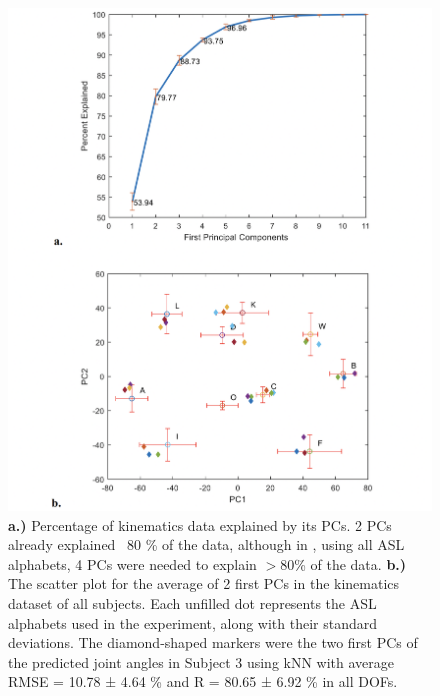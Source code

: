\documentclass[conference]{IEEEtran}
\begin{document}
\begin{figure}
    \centering
    \includegraphics[width=\columnwidth]{figure5.png}
    \caption{\textbf{a.)} Percentage of kinematics data explained by its PCs. 2 PCs already explained ~80 \% of 
the data, although in \cite{b28}, using all ASL alphabets, 4 PCs were needed to explain $>$80\% of the data. 
\textbf{b.)} The scatter plot for the average of 2 first PCs in the kinematics dataset of all subjects. Each unfilled 
dot represents the ASL alphabets used in the experiment, along with their standard deviations. The 
diamond-shaped markers were the two first PCs of the predicted joint angles in Subject 3 using kNN 
with average RMSE = 10.78 ± 4.64 \% and R = 80.65 ± 6.92 \% in all DOFs.}
    \label{figure5}
\end{figure}
\end{document}
